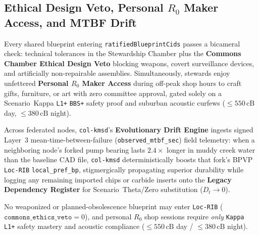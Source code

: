 \subsection{Ethical Design Veto, Personal $R_0$ Maker Access, and MTBF Drift}

Every shared blueprint entering \texttt{ratifiedBlueprintCids} passes a bicameral check: technical
tolerances in the Stewardship Chamber plus the \textbf{Commons Chamber Ethical Design Veto} blocking
weapons, covert surveillance devices, and artificially non-repairable assemblies. Simultaneously,
stewards enjoy unfettered \textbf{Personal $R_0$ Maker Access} during off-peak shop hours to craft gifts,
furniture, or art with zero committee approval, gated solely on a Scenario~Kappa \texttt{L1+}
\texttt{BBS+} safety proof and suburban acoustic curfews ($\le 550\,\mathrm{cB}$ day,
$\le 380\,\mathrm{cB}$ night).

Across federated nodes, \texttt{col-kmsd}'s \textbf{Evolutionary Drift Engine} ingests signed Layer~3
mean-time-between-failure (\texttt{observed\_mtbf\_sec}) field telemetry: when a neighboring node's
forked pump bearing lasts $2.4\times$ longer in muddy creek water than the baseline CAD file,
\texttt{col-kmsd} deterministically boosts that fork's BPVP \texttt{Loc-RIB} \texttt{local\_pref\_bp},
stigmergically propagating superior durability while logging any remaining imported chips or carbide
inserts onto the \textbf{Legacy Dependency Register} for Scenario~Theta/Zero substitution ($D_t \to 0$).

\begin{invariant}
\label{inv:waveb-alpha-maker}
No weaponized or planned-obsolescence blueprint may enter \texttt{Loc-RIB}
($\mathtt{commons\_ethics\_veto} = 0$), and personal $R_0$ shop sessions require \textit{only}
\texttt{Kappa L1+} safety mastery and acoustic compliance ($\le 550\,\mathrm{cB}$ day / $\le 380\,\mathrm{cB}$ night).
\end{invariant}

